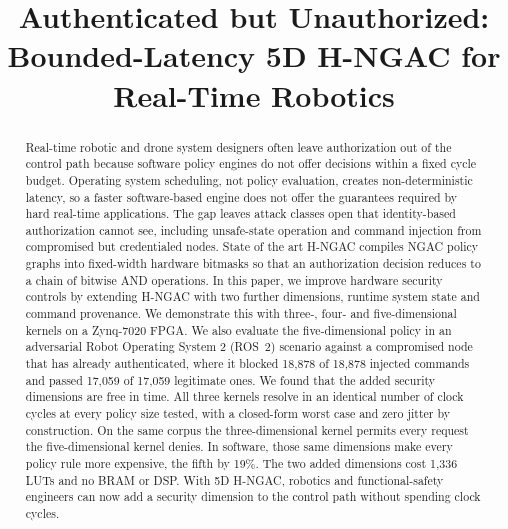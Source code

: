 \documentclass[conference]{IEEEtran}
\begin{document}
\title{Authenticated but Unauthorized: Bounded-Latency 5D H-NGAC for Real-Time Robotics}


\author{
}

\maketitle

\begin{abstract}
Real-time robotic and drone system designers often leave authorization out of the control path because software policy engines do not offer decisions within a fixed cycle budget. Operating system scheduling, not policy evaluation, creates non-deterministic latency, so a faster software-based engine does not offer the guarantees required by hard real-time applications. The gap leaves attack classes open that identity-based authorization cannot see, including unsafe-state operation and command injection from compromised but credentialed nodes. State of the art H-NGAC compiles NGAC policy graphs into fixed-width hardware bitmasks so that an authorization decision reduces to a chain of bitwise AND operations. In this paper, we improve hardware security controls by extending H-NGAC with two further dimensions, runtime system state and command provenance. We demonstrate this with three-, four- and five-dimensional kernels on a Zynq-7020 FPGA. %
We also evaluate the five-dimensional policy in an adversarial Robot Operating System 2 (ROS~2) scenario against a compromised node that has already authenticated, where it blocked 18{,}878 of 18{,}878 injected commands and passed 17{,}059 of 17{,}059 legitimate ones. We found that the added security dimensions are free in time. All three kernels resolve in an identical number of clock cycles at every policy size tested, with a closed-form worst case and zero jitter by construction.
On the same corpus the three-dimensional kernel permits every request the five-dimensional kernel denies.
In software, those same dimensions make every policy rule more expensive, the fifth by 19\%. The two added dimensions cost 1{,}336 LUTs and no BRAM or DSP. With 5D H-NGAC, robotics and functional-safety engineers can now add a security dimension to the control path without spending clock cycles.
\end{abstract}
\end{document}
